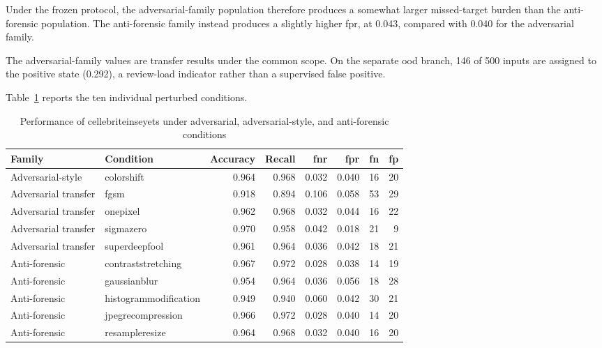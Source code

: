 Under the frozen protocol, the adversarial-family population therefore produces
a somewhat larger missed-target burden than the anti-forensic population. The
anti-forensic family instead produces a slightly higher \gls{fpr}, at 0.043,
compared with 0.040 for the adversarial family.

The adversarial-family values are transfer results under the common scope. On
the separate \gls{ood} branch, 146 of 500 inputs are assigned to the positive
state (0.292), a review-load indicator rather than a supervised false positive.

Table~\ref{tab:results-cellebrite-attack-metrics} reports the ten individual
perturbed conditions.

\begin{table}[H]
\centering
\caption{Performance of \gls{cellebriteinseyets} under adversarial,
adversarial-style, and anti-forensic conditions}
\label{tab:results-cellebrite-attack-metrics}
\scriptsize
\renewcommand{\arraystretch}{1.12}
\setlength{\tabcolsep}{4pt}
\begin{tabular}{@{}l l r r r r r r@{}}
\toprule
\textbf{Family} &
\textbf{Condition} &
\textbf{Accuracy} &
\textbf{Recall} &
\textbf{\gls{fnr}} &
\textbf{\gls{fpr}} &
\textbf{\acrshort{fn}} &
\textbf{\acrshort{fp}} \\
\midrule

Adversarial-style
&
\gls{colorshift}
&
0.964
&
0.968
&
0.032
&
0.040
&
16
&
20 \\

Adversarial transfer
&
\gls{fgsm}
&
0.918
&
0.894
&
0.106
&
0.058
&
53
&
29 \\

Adversarial transfer
&
\gls{onepixel}
&
0.962
&
0.968
&
0.032
&
0.044
&
16
&
22 \\

Adversarial transfer
&
\gls{sigmazero}
&
0.970
&
0.958
&
0.042
&
0.018
&
21
&
9 \\

Adversarial transfer
&
\gls{superdeepfool}
&
0.961
&
0.964
&
0.036
&
0.042
&
18
&
21 \\

\midrule

Anti-forensic
&
\gls{contraststretching}
&
0.967
&
0.972
&
0.028
&
0.038
&
14
&
19 \\

Anti-forensic
&
\gls{gaussianblur}
&
0.954
&
0.964
&
0.036
&
0.056
&
18
&
28 \\

Anti-forensic
&
\gls{histogrammodification}
&
0.949
&
0.940
&
0.060
&
0.042
&
30
&
21 \\

Anti-forensic
&
\gls{jpegrecompression}
&
0.966
&
0.972
&
0.028
&
0.040
&
14
&
20 \\

Anti-forensic
&
\gls{resampleresize}
&
0.964
&
0.968
&
0.032
&
0.040
&
16
&
20 \\

\bottomrule
\end{tabular}
\end{table}


